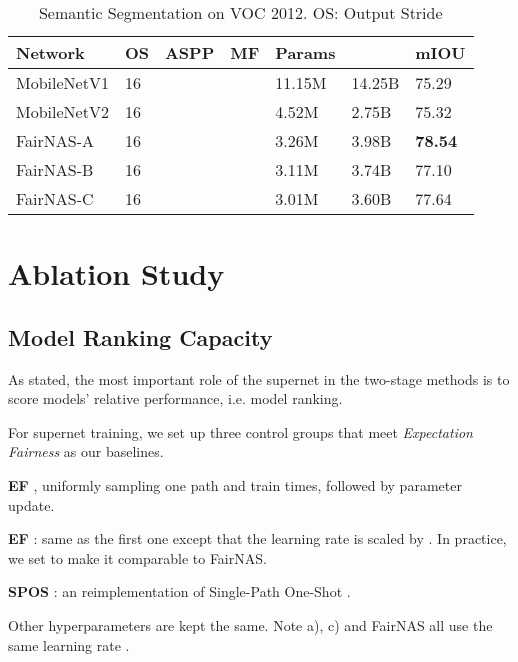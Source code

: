 \documentclass[10pt,twocolumn,letterpaper]{article}
\theoremstyle{definition}
\newcommand{\cmark}{\ding{51}}\newcommand{\xmark}{\ding{55}}\renewcommand\and{\end{tabular}\kern-\tabcolsep\  \ \kern-\tabcolsep\begin{tabular}[t]{c}}
\begin{document}
\begin{table}[ht]
	\begin{center}
		\begin{small}
\begin{tabular}{|l|l|c|Hl|l|l|}
					\hline Network & OS & ASPP & MF & Params& & mIOU  \\
					\hline MobileNetV1 \cite{howard2017mobilenets} & 16 & \cmark & &11.15M & 14.25B &75.29 \\
					MobileNetV2 \cite{sandler2018mobilenetv2} & 16 & \xmark & \xmark & 4.52M & 2.75B & 75.32\\
FairNAS-A	& 16	& \xmark& & 3.26M & 3.98B & \textbf{78.54} \\
					FairNAS-B & 16 & \xmark& & 3.11M & 3.74B & 77.10 \\
					FairNAS-C & 16 & \xmark & &  3.01M & 3.60B & 77.64 \\
\hline
\end{tabular}
		\end{small}
	\end{center}
	\caption{Semantic Segmentation on VOC 2012. OS: Output Stride}
	\label{tab:segment-voc}
\end{table}

\section{Ablation Study}

\subsection{Model Ranking Capacity} 

As stated, the most important role of the supernet in the two-stage methods is to score models' relative performance, i.e. model ranking.

For supernet training, we set up three control groups that meet \emph{Expectation Fairness}  as our baselines. 
\begin{enumerate*} 
	\item \textbf{EF} , uniformly sampling one path and train  times, followed by parameter update. 
	\item \textbf{EF} : same as the first one except that the learning rate is scaled by . In practice, we set  to make it comparable to FairNAS. 
	\item \textbf{SPOS} : an reimplementation of Single-Path One-Shot \cite{guo2019single}. 
\end{enumerate*}
Other hyperparameters are kept the same. Note a), c) and FairNAS all use the same learning rate . 
\end{document}
